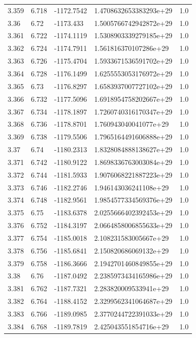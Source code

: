 \begin{tabular}{lllll}
3.359 & 6.718 & -1172.7542 & 1.4708632653383293e+29 & 1.0 \\
3.36 & 6.72 & -1173.433 & 1.5005766742942872e+29 & 1.0 \\
3.361 & 6.722 & -1174.1119 & 1.5308903339279185e+29 & 1.0 \\
3.362 & 6.724 & -1174.7911 & 1.561816370107286e+29 & 1.0 \\
3.363 & 6.726 & -1175.4704 & 1.5933671536591702e+29 & 1.0 \\
3.364 & 6.728 & -1176.1499 & 1.6255553053176972e+29 & 1.0 \\
3.365 & 6.73 & -1176.8297 & 1.6583937007727102e+29 & 1.0 \\
3.366 & 6.732 & -1177.5096 & 1.6918954758202667e+29 & 1.0 \\
3.367 & 6.734 & -1178.1897 & 1.7260740316170347e+29 & 1.0 \\
3.368 & 6.736 & -1178.8701 & 1.760943040041077e+29 & 1.0 \\
3.369 & 6.738 & -1179.5506 & 1.7965164491606888e+29 & 1.0 \\
3.37 & 6.74 & -1180.2313 & 1.8328084888138627e+29 & 1.0 \\
3.371 & 6.742 & -1180.9122 & 1.8698336763003084e+29 & 1.0 \\
3.372 & 6.744 & -1181.5933 & 1.9076068221887223e+29 & 1.0 \\
3.373 & 6.746 & -1182.2746 & 1.946143036241108e+29 & 1.0 \\
3.374 & 6.748 & -1182.9561 & 1.9854577334569376e+29 & 1.0 \\
3.375 & 6.75 & -1183.6378 & 2.0255666402392453e+29 & 1.0 \\
3.376 & 6.752 & -1184.3197 & 2.0664858006855633e+29 & 1.0 \\
3.377 & 6.754 & -1185.0018 & 2.108231583005667e+29 & 1.0 \\
3.378 & 6.756 & -1185.6841 & 2.150820686069132e+29 & 1.0 \\
3.379 & 6.758 & -1186.3666 & 2.1942701460849855e+29 & 1.0 \\
3.38 & 6.76 & -1187.0492 & 2.2385973434165986e+29 & 1.0 \\
3.381 & 6.762 & -1187.7321 & 2.283820009533941e+29 & 1.0 \\
3.382 & 6.764 & -1188.4152 & 2.3299562341064687e+29 & 1.0 \\
3.383 & 6.766 & -1189.0985 & 2.3770244722391033e+29 & 1.0 \\
3.384 & 6.768 & -1189.7819 & 2.425043551854716e+29 & 1.0 \\

\end{tabular}
